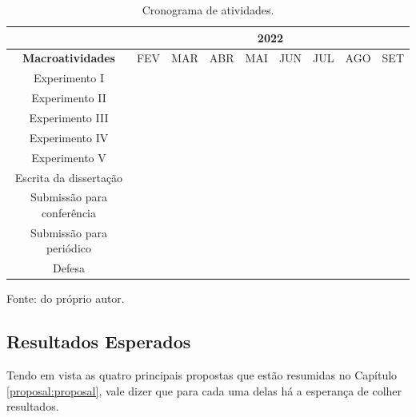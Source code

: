 \begin{table}[ht]
    \centering
    \caption{Cronograma de atividades.}
    \label{proposal:cron:table:2}
        \begin{tabular}{|c|c|c|c|c|c|c|l|l|} 
            \hline
                                    & \multicolumn{8}{c|}{2022}                        \\ 
            \hline
            \textbf{Macroatividades}        & FEV & MAR & ABR & MAI & JUN & JUL & AGO & SET  \\ 
            \hline
            Experimento I                   & \cellcolor{midgray} & \cellcolor{midgray} & \cellcolor{midgray} &     &     &     &     &      \\ 
            \hline
            Experimento II                 &     & \cellcolor{midgray} & \cellcolor{midgray} &     &     &     &     &      \\ 
            \hline
            Experimento III                  &     &     &     & \cellcolor{midgray} & \cellcolor{midgray} & \cellcolor{midgray} &     &  \\ 
            \hline
            Experimento IV                  &     &     &     & \cellcolor{midgray} & \cellcolor{midgray} &     &     &      \\ 
            \hline
            Experimento V                   &     &     &     &     &     & \cellcolor{midgray} &     &      \\ 
            \hline
            Escrita da dissertação          & \cellcolor{midgray} & \cellcolor{midgray} & \cellcolor{midgray} & \cellcolor{midgray} & \cellcolor{midgray} & \cellcolor{midgray} & \cellcolor{midgray} &  \\ 
            \hline
            Submissão para conferência      &     &     &     & \cellcolor{midgray} &     &     &     &      \\ 
            \hline
            Submissão para periódico        &     &     &     &     &     &     & \cellcolor{midgray} &      \\ 
            \hline
            Defesa                          &     &     &     &     &     &     &     & \cellcolor{midgray} \\
            \hline
        \end{tabular}
    
    \vspace*{1 cm}
    Fonte: do próprio autor.
\end{table}


\subsection{Resultados Esperados}
\label{proposal:expres}
Tendo em vista as quatro principais propostas que estão resumidas no Capítulo \ref{proposal:proposal}, vale dizer que para cada uma delas há a esperança de colher resultados.

